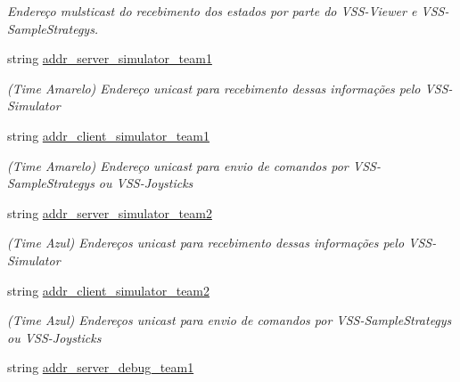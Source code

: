 \begin{DoxyCompactItemize}
\begin{DoxyCompactList}\small\item\em Endereço mulsticast do recebimento dos estados por parte do V\+S\+S-\/\+Viewer e V\+S\+S-\/\+Sample\+Strategys. \end{DoxyCompactList}\item 
string \hyperlink{classInterface_afe824e3c6a845f60ef4e95592d6aea8c}{addr\+\_\+server\+\_\+simulator\+\_\+team1}\hypertarget{classInterface_afe824e3c6a845f60ef4e95592d6aea8c}{}\label{classInterface_afe824e3c6a845f60ef4e95592d6aea8c}

\begin{DoxyCompactList}\small\item\em (Time Amarelo) Endereço unicast para recebimento dessas informações pelo V\+S\+S-\/\+Simulator \end{DoxyCompactList}\item 
string \hyperlink{classInterface_a5fd23546358caf45c28aab623783aa74}{addr\+\_\+client\+\_\+simulator\+\_\+team1}\hypertarget{classInterface_a5fd23546358caf45c28aab623783aa74}{}\label{classInterface_a5fd23546358caf45c28aab623783aa74}

\begin{DoxyCompactList}\small\item\em (Time Amarelo) Endereço unicast para envio de comandos por V\+S\+S-\/\+Sample\+Strategys ou V\+S\+S-\/\+Joysticks \end{DoxyCompactList}\item 
string \hyperlink{classInterface_a5bf42480628d97126c4ccf79dab80608}{addr\+\_\+server\+\_\+simulator\+\_\+team2}\hypertarget{classInterface_a5bf42480628d97126c4ccf79dab80608}{}\label{classInterface_a5bf42480628d97126c4ccf79dab80608}

\begin{DoxyCompactList}\small\item\em (Time Azul) Endereços unicast para recebimento dessas informações pelo V\+S\+S-\/\+Simulator \end{DoxyCompactList}\item 
string \hyperlink{classInterface_a3350d92b68427e361d42e403cd0402ea}{addr\+\_\+client\+\_\+simulator\+\_\+team2}\hypertarget{classInterface_a3350d92b68427e361d42e403cd0402ea}{}\label{classInterface_a3350d92b68427e361d42e403cd0402ea}

\begin{DoxyCompactList}\small\item\em (Time Azul) Endereços unicast para envio de comandos por V\+S\+S-\/\+Sample\+Strategys ou V\+S\+S-\/\+Joysticks \end{DoxyCompactList}\item 
string \hyperlink{classInterface_a5e15dc6d237ba5658b621a9267834058}{addr\+\_\+server\+\_\+debug\+\_\+team1}\hypertarget{classInterface_a5e15dc6d237ba5658b621a9267834058}{}\label{classInterface_a5e15dc6d237ba5658b621a9267834058}


\end{DoxyCompactItemize}
